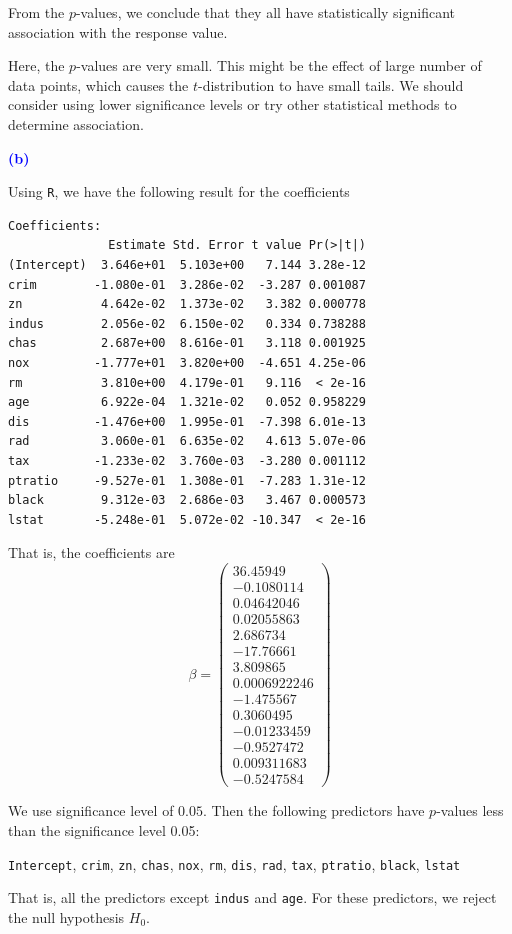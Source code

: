 \documentclass[a4paper,12pt]{article}
\newcommand{\code}[1]{\texttt{#1}}
\newcommand{\qnum}[1]{\noindent\textcolor{blue}{\textbf{(#1)}}}
\begin{document}
From the $p$-values, we conclude that they all have statistically significant association with the response value.
\bigskip

Here, the $p$-values are very small. This might be the effect of large number of data points, which causes the $t$-distribution to have small tails. We should consider using lower significance levels or try other statistical methods to determine association.
\bigskip

\qnum{b}

Using \code{R}, we have the following result for the coefficients
\begin{verbatim}
Coefficients:
              Estimate Std. Error t value Pr(>|t|)    
(Intercept)  3.646e+01  5.103e+00   7.144 3.28e-12
crim        -1.080e-01  3.286e-02  -3.287 0.001087
zn           4.642e-02  1.373e-02   3.382 0.000778
indus        2.056e-02  6.150e-02   0.334 0.738288    
chas         2.687e+00  8.616e-01   3.118 0.001925
nox         -1.777e+01  3.820e+00  -4.651 4.25e-06
rm           3.810e+00  4.179e-01   9.116  < 2e-16
age          6.922e-04  1.321e-02   0.052 0.958229    
dis         -1.476e+00  1.995e-01  -7.398 6.01e-13
rad          3.060e-01  6.635e-02   4.613 5.07e-06
tax         -1.233e-02  3.760e-03  -3.280 0.001112
ptratio     -9.527e-01  1.308e-01  -7.283 1.31e-12
black        9.312e-03  2.686e-03   3.467 0.000573
lstat       -5.248e-01  5.072e-02 -10.347  < 2e-16
\end{verbatim}

That is, the coefficients are 
\[
    \beta = 
    \begin{pmatrix}
        36.45949\\ -0.1080114\\ 0.04642046\\ 0.02055863\\ 2.686734\\ -17.76661\\ 3.809865\\ 0.0006922246\\ -1.475567\\ 0.3060495\\ -0.01233459\\ -0.9527472\\ 0.009311683\\ -0.5247584
    \end{pmatrix}
\]

We use significance level of $0.05$. Then the following predictors have $p$-values less than the significance level 0.05:
\begin{center}
    \code{Intercept}, 
    \code{crim},
    \code{zn},
    \code{chas},
    \code{nox},
    \code{rm},
    \code{dis},
    \code{rad},
    \code{tax},
    \code{ptratio},
    \code{black},
    \code{lstat}
\end{center}
That is, all the predictors except \code{indus} and \code{age}.
For these predictors, we reject the null hypothesis $H_0$.
\bigskip
\end{document}
